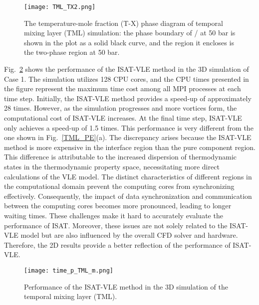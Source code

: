 \begin{figure}[htbp]
\centering
\texttt{[image: TML\_TX2.png]}
\caption{The temperature-mole fraction (T-X) phase diagram of temporal mixing layer (TML) simulation: the phase boundary of / at 50 bar is shown in the plot as a solid black curve, and the region it encloses is the two-phase region at 50 bar.}
\label{TML_TX} 
\end{figure}

Fig.~\ref{TML_3D_performace} shows the performance of the ISAT-VLE method in the 3D simulation of Case 1. The simulation utilizes 128 CPU cores, and the CPU times presented in the figure represent the maximum time cost among all MPI processes at each time step. Initially, the ISAT-VLE method provides a speed-up of approximately 28 times. However, as the simulation progresses and more vortices form, the computational cost of ISAT-VLE increases. At the final time step, ISAT-VLE only achieves a speed-up of 1.5 times. This performance is very different from the one shown in Fig.~\ref{TML_PE}(a). The discrepancy arises because the ISAT-VLE method is more expensive in the interface region than the pure component region. This difference is attributable to the increased dispersion of thermodynamic states in the thermodynamic property space, necessitating more direct calculations of the VLE model. The distinct characteristics of different regions in the computational domain prevent the computing cores from synchronizing effectively. Consequently, the impact of data synchronization and communication between the computing cores becomes more pronounced, leading to longer waiting times. These challenges make it hard to accurately evaluate the performance of ISAT. Moreover, these issues are not solely related to the ISAT-VLE model but are also influenced by the overall CFD solver and hardware. Therefore, the 2D results provide a better reflection of the performance of ISAT-VLE.



\begin{figure}[htbp]
\centering
\texttt{[image: time\_p\_TML\_m.png]}
\caption{Performance of the ISAT-VLE method in the 3D simulation of the temporal mixing layer (TML).}
\label{TML_3D_performace} 
\end{figure}

